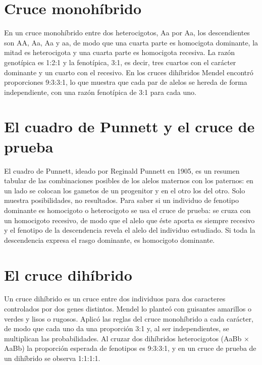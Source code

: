 \documentclass{book}
\begin{document}

\section{Cruce monohíbrido}

En un cruce monohíbrido entre dos heterocigotos, Aa por Aa, los descendientes son AA, Aa, Aa y aa, de modo que una cuarta parte es homocigota dominante, la mitad es heterocigota y una cuarta parte es homocigota recesiva. La razón genotípica es 1:2:1 y la fenotípica, 3:1, es decir, tres cuartos con el carácter dominante y un cuarto con el recesivo. En los cruces dihíbridos Mendel encontró proporciones 9:3:3:1, lo que muestra que cada par de alelos se hereda de forma independiente, con una razón fenotípica de 3:1 para cada uno.


\section{El cuadro de Punnett y el cruce de prueba}

El cuadro de Punnett, ideado por Reginald Punnett en 1905, es un resumen tabular de las combinaciones posibles de los alelos maternos con los paternos: en un lado se colocan los gametos de un progenitor y en el otro los del otro. Solo muestra posibilidades, no resultados. Para saber si un individuo de fenotipo dominante es homocigoto o heterocigoto se usa el cruce de prueba: se cruza con un homocigoto recesivo, de modo que el alelo que éste aporta es siempre recesivo y el fenotipo de la descendencia revela el alelo del individuo estudiado. Si toda la descendencia expresa el rasgo dominante, es homocigoto dominante.


\section{El cruce dihíbrido}

Un cruce dihíbrido es un cruce entre dos individuos para dos caracteres controlados por dos genes distintos. Mendel lo planteó con guisantes amarillos o verdes y lisos o rugosos. Aplicó las reglas del cruce monohíbrido a cada carácter, de modo que cada uno da una proporción 3:1 y, al ser independientes, se multiplican las probabilidades. Al cruzar dos dihíbridos heterocigotos (AaBb \(\times\) AaBb) la proporción esperada de fenotipos es 9:3:3:1, y en un cruce de prueba de un dihíbrido se observa 1:1:1:1.
\end{document}
